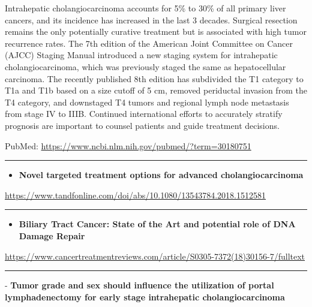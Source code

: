 \documentclass[]{article}
\providecommand{\tightlist}{%
  \setlength{\itemsep}{0pt}\setlength{\parskip}{0pt}}
\begin{document}
Intrahepatic cholangiocarcinoma accounts for 5\% to 30\% of all primary
liver cancers, and its incidence has increased in the last 3 decades.
Surgical resection remains the only potentially curative treatment but
is associated with high tumor recurrence rates. The 7th edition of the
American Joint Committee on Cancer (AJCC) Staging Manual introduced a
new staging system for intrahepatic cholangiocarcinoma, which was
previously staged the same as hepatocellular carcinoma. The recently
published 8th edition has subdivided the T1 category to T1a and T1b
based on a size cutoff of 5 cm, removed periductal invasion from the T4
category, and downstaged T4 tumors and regional lymph node metastasis
from stage IV to IIIB. Continued international efforts to accurately
stratify prognosis are important to counsel patients and guide treatment
decisions.

PubMed: \url{https://www.ncbi.nlm.nih.gov/pubmed/?term=30180751}

{}

{}

\begin{center}\rule{0.5\linewidth}{\linethickness}\end{center}

\begin{itemize}
\tightlist
\item
  \textbf{Novel targeted treatment options for advanced
  cholangiocarcinoma}
\end{itemize}

\url{https://www.tandfonline.com/doi/abs/10.1080/13543784.2018.1512581}

\begin{center}\rule{0.5\linewidth}{\linethickness}\end{center}

\begin{itemize}
\tightlist
\item
  \textbf{Biliary Tract Cancer: State of the Art and potential role of
  DNA Damage Repair}
\end{itemize}

\url{https://www.cancertreatmentreviews.com/article/S0305-7372(18)30156-7/fulltext}

\begin{center}\rule{0.5\linewidth}{\linethickness}\end{center}

 - \textbf{Tumor grade and sex should influence the utilization of
portal lymphadenectomy for early stage intrahepatic cholangiocarcinoma}
\end{document}
